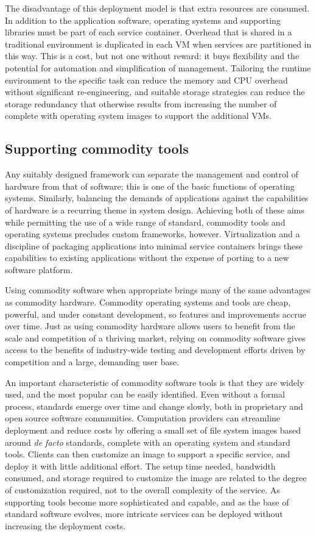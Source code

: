 The disadvantage of this deployment model is that extra resources are consumed. In addition to the application software, operating systems and supporting libraries must be part of each service container. Overhead that is shared in a traditional environment is duplicated in each VM when services are partitioned in this way. This is a cost, but not one without reward: it buys flexibility and the potential for automation and simplification of management. Tailoring the runtime environment to the specific task can reduce the memory and CPU overhead without significant re-engineering, and suitable storage strategies can reduce the storage redundancy that otherwise results from increasing the number of complete with operating system images to support the additional VMs.

\subsection{Supporting commodity tools}

Any suitably designed framework can separate the management and control of hardware from that of software; this is one of the basic functions of operating systems. Similarly, balancing the demands of applications against the capabilities of hardware is a recurring theme in system design. Achieving both of these aims while permitting the use of a wide range of standard, commodity tools and operating systems precludes custom frameworks, however. Virtualization and a discipline of packaging applications into minimal service containers brings these capabilities to existing applications without the expense of porting to a new software platform.

Using commodity software when appropriate brings many of the same advantages as commodity hardware. Commodity operating systems and tools are cheap, powerful, and under constant development, so features and improvements accrue over time. Just as using commodity hardware allows users to benefit from the scale and competition of a thriving market, relying on commodity software gives access to the benefits of industry-wide testing and development efforts driven by competition and a large, demanding user base.

An important characteristic of commodity software tools is that they are widely used, and the most popular can be easily identified. Even without a formal process, standards emerge over time and change slowly, both in proprietary and open source software communities. Computation providers can streamline deployment and reduce costs by offering a small set of file system images based around \emph{de facto} standards, complete with an operating system and standard tools. Clients can then customize an image to support a specific service, and deploy it with little additional effort. The setup time needed, bandwidth consumed, and storage required to customize the image are related to the degree of customization required, not to the overall complexity of the service. As supporting tools become more sophisticated and capable, and as the base of standard software evolves, more intricate services can be deployed without increasing the deployment costs.

